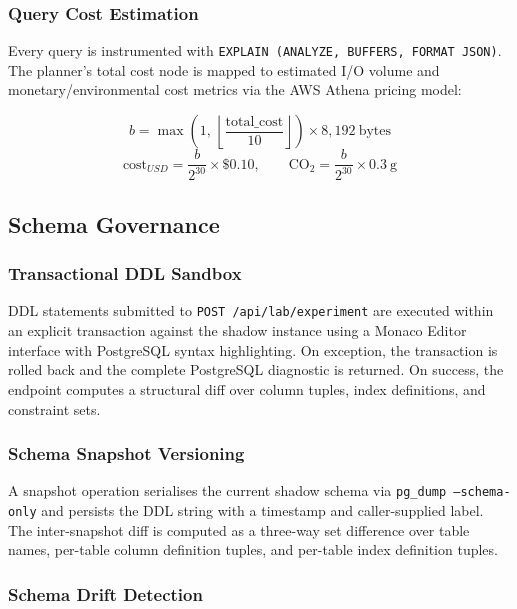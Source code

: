 \documentclass[12pt,a4paper]{report}
\begin{document}
\subsubsection{Query Cost Estimation}

Every query is instrumented with \texttt{EXPLAIN (ANALYZE, BUFFERS, FORMAT JSON)}. The planner's total cost node is mapped to estimated I/O volume and monetary/environmental cost metrics via the AWS Athena pricing model:

\begin{equation}
    b = \max\!\left(1,\, \left\lfloor\frac{\text{total\_cost}}{10}\right\rfloor\right) \times 8{,}192\ \text{bytes}
\end{equation}
\begin{equation}
    \text{cost}_{USD} = \frac{b}{2^{30}} \times \$0.10, \qquad
    \text{CO}_2 = \frac{b}{2^{30}} \times 0.3\ \text{g}
\end{equation}

\subsection{Schema Governance}

\subsubsection{Transactional DDL Sandbox}

DDL statements submitted to \texttt{POST /api/lab/experiment} are executed within an explicit transaction against the shadow instance using a Monaco Editor interface with PostgreSQL syntax highlighting. On exception, the transaction is rolled back and the complete PostgreSQL diagnostic is returned. On success, the endpoint computes a structural diff over column tuples, index definitions, and constraint sets.

\subsubsection{Schema Snapshot Versioning}

A snapshot operation serialises the current shadow schema via \texttt{pg\_dump --schema-only} and persists the DDL string with a timestamp and caller-supplied label. The inter-snapshot diff is computed as a three-way set difference over table names, per-table column definition tuples, and per-table index definition tuples.

\subsubsection{Schema Drift Detection}
\end{document}
